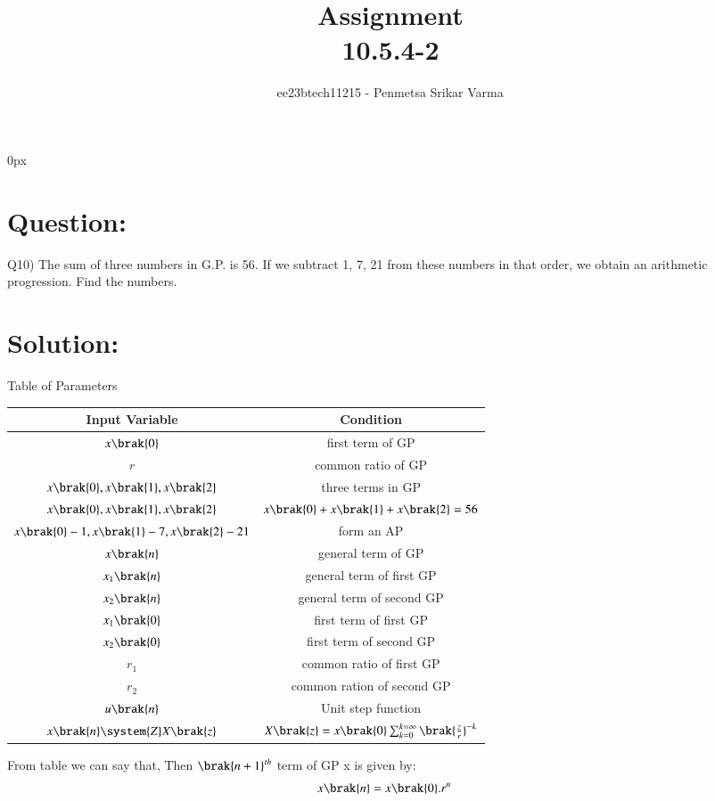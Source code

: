 \documentclass[beamer]{IEEEtran}
\theoremstyle{remark}
\begin{document}
\parindent 0px


\title{Assignment\\[1ex]10.5.4-2}
\author{ee23btech11215 - Penmetsa Srikar Varma$^{}$%
}
\maketitle
\newpage
\bigskip

\renewcommand{\thefigure}{\theenumi}
\renewcommand{\thetable}{\theenumi}
\section*{Question:}
Q10) The sum of three numbers in G.P. is 56. If we subtract 1, 7, 21 from these numbers in that order, we obtain an arithmetic progression. Find the numbers.
\section*{Solution:}
{\centering
Table of Parameters\\
}
\begin{table}[h]
    \centering
    \begin{tabular}{|c|c|}
        \hline
         Input Variable & Condition\\
        \hline
         $x\brak{0}$ & first term of GP\\
         \hline
         $r$ & common ratio of GP\\
         \hline
         $x\brak{0},x\brak{1},x\brak{2}$ & three terms in GP \\
         \hline
         $x\brak{0},x\brak{1},x\brak{2}$ & $x\brak{0}+x\brak{1}+x\brak{2}=56$ \\
         \hline
          $x\brak{0}-1,x\brak{1}-7,x\brak{2}-21$ & form an AP \\
         \hline
          $x\brak{n}$ & general term of GP \\
         \hline
           $x_1\brak{n}$ & general term of first GP\\
         \hline
           $x_2\brak{n}$ & general term of second GP\\
         \hline
           $x_1\brak{0}$ & first term of first GP\\
         \hline
           $x_2\brak{0}$ & first term of second GP\\
         \hline
           $r_1$ & common ratio of first GP\\
         \hline
           $r_2$ & common ration of second GP\\
         \hline
          $u\brak{n}$ & Unit step function  \\
         \hline
         $x\brak{n}\system{Z}X\brak{z}$ & $X\brak{z}=x\brak{0}\sum_{k=0}^{k=\infty}\brak{\frac{z}{r}}^{-k}$\\
         \hline
    \end{tabular}
     \label{tab:t1}
\end{table}
From table we can say that,
Then $\brak{n+1}^{th}$ term of GP x is given by:
\begin{align}
\label{e1}
x\brak{n}&=x\brak{0}.r^{n}
\end{align}
\end{document}
